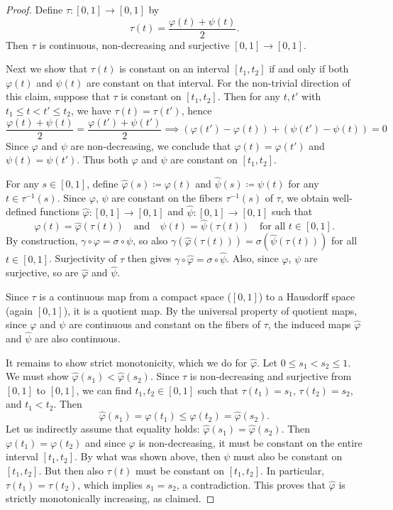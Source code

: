 \documentclass[10pt,a4paper]{amsart}
\newcommand{\g}{\gamma}
\newcommand{\hps}{\hat{\psi}}
\newcommand{\hvp}{\hat{\varphi}}
\newcommand{\ps}{\psi}
\newcommand{\s}{\sigma}
\newcommand{\vp}{\varphi}
\begin{document}
\begin{proof}
Define $\tau \colon [0,1] \to [0,1]$ by
$$
\tau(t) = \frac{\varphi(t) + \psi(t)}{2}.
$$
Then $\tau$ is continuous, non-decreasing and surjective $[0,1]\to [0,1]$. 

Next we show that $\tau(t)$ is constant on an interval $[t_1, t_2]$ if and only if both $\vp(t)$ and $\ps(t)$ are constant on that interval. For the non-trivial direction of this claim, suppose that $\tau$ is constant on $[t_1, t_2]$. Then for any $t, t'$ with $t_1 \le t < t' \le t_2$, we have $\tau(t) = \tau(t')$, hence
\[
\frac{\vp(t) + \ps(t)}{2} = \frac{\vp(t') + \ps(t')}{2} \implies (\vp(t') - \vp(t)) + (\ps(t') - \ps(t)) = 0
\]
Since $\vp$ and $\ps$ are non-decreasing, we conclude that $\vp(t) = \vp(t')$ and $\ps(t) = \ps(t')$. Thus both $\vp$ and $\ps$ are constant on $[t_1, t_2]$.


For any $s \in [0,1]$, define $\hvp(s) \coloneqq \vp(t)$ and $\hps(s) \coloneqq \psi(t)$ for any $t \in \tau^{-1}(s)$. Since $\vp$, $\psi$ are constant on the fibers $\tau^{-1}(s)$ of $\tau$, we obtain well-defined functions 
$\hvp \colon [0,1] \to [0,1]$ and $\hps \colon [0,1] \to [0,1]$ such that
\[
\vp(t) = \hvp(\tau(t)) \quad \text{and} \quad \ps(t) = \hps(\tau(t)) \quad \text{for all } t \in [0,1].
\]
By construction, $\g\circ\vp = \sigma\circ \psi$, so also $\g(\hvp(\tau(t))) = \s(\hps(\tau(t)))$ for all $t\in [0,1]$.
Surjectivity of $\tau$ then gives $\g\circ \hvp = \sigma\circ \hps$. Also, since $\varphi$, $\psi$ are surjective, so are $\hvp$ and $\hps$.

Since $\tau$ is a continuous map from a compact space ($[0,1]$) to a Hausdorff space (again $[0,1]$), it is a quotient map. By the universal property of quotient maps, since $\vp$ and $\ps$ are continuous and constant on the fibers of $\tau$, the induced maps $\hvp$ and $\hps$ are also continuous.

It remains to show strict monotonicity, which we do for $\hat\varphi$. Let $0 \le s_1 < s_2 \le 1$. We must show $\hvp(s_1) < \hvp(s_2)$.
Since $\tau$ is non-decreasing and surjective from $[0,1]$ to $[0,1]$, we can find $t_1, t_2 \in [0,1]$ such that $\tau(t_1) = s_1$, $\tau(t_2) = s_2$, and $t_1 < t_2$. Then
\[
\hat\varphi(s_1) = \varphi(t_1) \le \varphi(t_2) = \hat\varphi(s_2).
\]
Let us indirectly assume that equality holds: $\hvp(s_1) = \hvp(s_2)$. Then $\vp(t_1) = \vp(t_2)$ and since $\vp$ is non-decreasing, it must be constant on the entire interval $[t_1, t_2]$. By what was shown above, then $\ps$ must also be constant on $[t_1, t_2]$.
But then also $\tau(t)$ must be constant on $[t_1, t_2]$. In particular, $\tau(t_1) = \tau(t_2)$, which implies $s_1 = s_2$, a contradiction.
This proves that $\hvp$ is strictly monotonically increasing, as claimed.
\end{proof}
\end{document}
